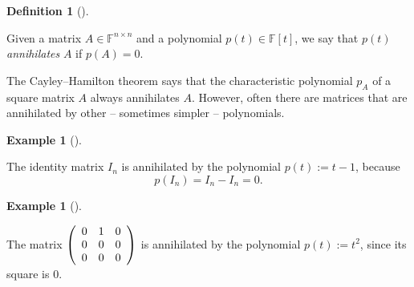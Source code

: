 \documentclass[numbers=enddot,12pt,final,onecolumn,notitlepage]{scrartcl}%
\numberwithin{exer}{subsection}
\theoremstyle{definition}
\newtheorem{defi}[theo]{Definition}
\newenvironment{definition}[1][]
{\begin{defi}[#1]\begin{leftbar}}
{\end{leftbar}\end{defi}}
\newtheorem{exam}[theo]{Example}
\newenvironment{example}[1][]
{\begin{exam}[#1]\begin{leftbar}}
{\end{leftbar}\end{exam}}
\begin{document}
\begin{definition}
\label{def.jnf.mipo.annih}Given a matrix $A\in\mathbb{F}^{n\times n}$ and a
polynomial $p\left(  t\right)  \in\mathbb{F}\left[  t\right]  $, we say that
$p\left(  t\right)  $ \emph{annihilates} $A$ if $p\left(  A\right)  =0$.
\end{definition}

The Cayley--Hamilton theorem says that the characteristic polynomial $p_{A}$
of a square matrix $A$ always annihilates $A$. However, often there are
matrices that are annihilated by other -- sometimes simpler -- polynomials.

\begin{example}
The identity matrix $I_{n}$ is annihilated by the polynomial $p\left(
t\right)  :=t-1$, because%
\[
p\left(  I_{n}\right)  =I_{n}-I_{n}=0.
\]

\end{example}

\begin{example}
The matrix $\left(
\begin{array}
[c]{ccc}%
0 & 1 & 0\\
0 & 0 & 0\\
0 & 0 & 0
\end{array}
\right)  $ is annihilated by the polynomial $p\left(  t\right)  :=t^{2}$,
since its square is $0$.
\end{example}
\end{document}
